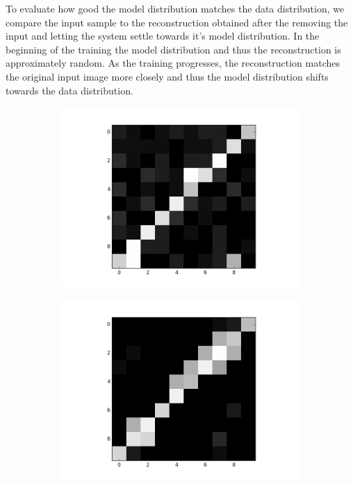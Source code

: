To evaluate how good the model distribution matches the data distribution, we compare the input sample to the reconstruction obtained after the removing the input and letting the system settle towards it's model distribution.
In the beginning of the training the model distribution and thus the reconstruction is approximately random.
As the training progresses, the reconstruction matches the original input image more closely and thus the model distribution shifts towards the data distribution.

\begin{figure}[h!]
	\centering
	\begin{subfigure}{.25\textwidth}
  		\centering
  		\includegraphics[width=\linewidth]{imgs/reconst/00001.png}
  		\label{fig:sub1}
	\end{subfigure}%
	\begin{subfigure}{.25\textwidth}
  		\centering
  		\includegraphics[width=\linewidth]{imgs/reconst/00003.png}

\end{subfigure}
\end{figure}
